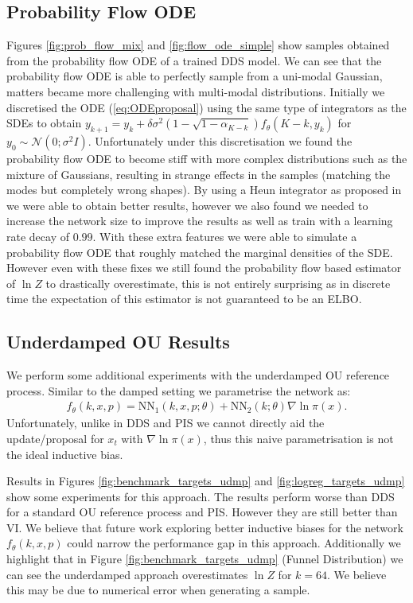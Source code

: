 \documentclass{article} %
\begin{document}
\subsection{Probability Flow ODE}\label{app:probaflowODE}

Figures \ref{fig:prob_flow_mix} and \ref{fig:flow_ode_simple} show samples obtained from the probability flow ODE of a trained DDS model. We can see that the probability flow ODE is able to perfectly sample from a uni-modal Gaussian, matters became more challenging with multi-modal distributions.  Initially we discretised the ODE (\ref{eq:ODEproposal}) using the same type of integrators as the SDEs to obtain $ y_{k+1} = y_{k} +  \delta \sigma^2 (1 - \sqrt{1-\alpha_{K-k} }) f_\theta (K-k, y_{k})$ for $y_0 \sim \mathcal{N}(0;\sigma^2 I)$. Unfortunately under this discretisation we found the probability flow ODE to become stiff with more complex distributions such as the mixture of Gaussians, resulting in strange effects in the samples (matching the modes but completely wrong shapes). By using a Heun integrator as proposed in \cite{karras2022elucidating} we were able to obtain better results, however we also found we needed to increase the network size to improve the results as well as train with a learning rate decay of $0.99$. With these extra features we were able to simulate a probability flow ODE that roughly matched the marginal densities of the SDE. However even with these fixes we still found the probability flow based estimator of $\ln Z$ to drastically overestimate, this is not entirely surprising as in discrete time the expectation of this estimator is not guaranteed to be an ELBO.

\subsection{Underdamped OU Results} \label{apdx:undexp}

We perform some additional experiments with the underdamped OU reference process. Similar to the damped setting we parametrise the network as:
\begin{align}
    f_\theta(k, x, p) = \mathrm{NN}_1(k, x, p; \theta)  + \mathrm{NN}_2(k; \theta) \nabla \ln \pi(x).
\end{align}
Unfortunately, unlike in DDS and PIS we cannot directly aid the update/proposal for $x_t$ with $ \nabla \ln \pi(x)$, thus this naive parametrisation is not the ideal inductive bias.

Results in Figures \ref{fig:benchmark_targets_udmp} and \ref{fig:logreg_targets_udmp} show some experiments for this approach. The results perform worse than DDS for a standard OU reference process and PIS. However they are still better than VI. We believe that future work exploring better inductive biases for the network $f_\theta(k, x, p)$ could narrow the performance gap in this approach. Additionally we highlight that in Figure \ref{fig:benchmark_targets_udmp} (Funnel Distribution) we can see the underdamped approach overestimates $\ln Z$ for $k=64$. We believe this may be due to numerical error when generating a sample.
\end{document}
